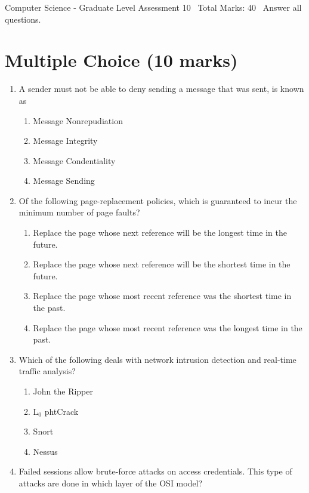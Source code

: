 \documentclass[12pt]{article}
\begin{document}
\begin{center}
Computer Science - Graduate Level Assessment 10 \
Total Marks: 40 \
Answer all questions.
\end{center}

\section*{Multiple Choice (10 marks)}
\begin{enumerate}[label=\arabic*.]
\item A sender must not be able to deny sending a message that was sent, is known as
\begin{enumerate}[label=(\alph*)]
    \item Message Nonrepudiation
    \item Message Integrity
    \item Message Condentiality
    \item Message Sending
\end{enumerate}
\item Of the following page-replacement policies, which is guaranteed to incur the minimum number of page faults?
\begin{enumerate}[label=(\alph*)]
    \item Replace the page whose next reference will be the longest time in the future.
    \item Replace the page whose next reference will be the shortest time in the future.
    \item Replace the page whose most recent reference was the shortest time in the past.
    \item Replace the page whose most recent reference was the longest time in the past.
\end{enumerate}
\item Which of the following deals with network intrusion detection and real-time traffic analysis?
\begin{enumerate}[label=(\alph*)]
    \item John the Ripper
    \item L$_{0}$ phtCrack
    \item Snort
    \item Nessus
\end{enumerate}
\item Failed sessions allow brute-force attacks on access credentials. This type of attacks are done in which layer of the OSI model?
\begin{enumerate}[label=(\alph*)]

\end{enumerate}
\end{enumerate}
\end{document}
